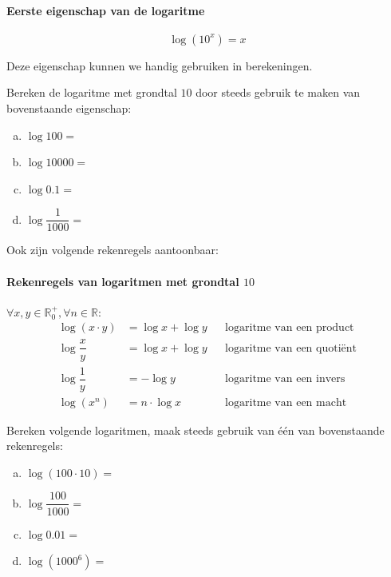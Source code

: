 \documentclass[12pt,twoside]{article}
\begin{document}
\paragraph*{Eerste eigenschap van de logaritme}
\begin{mdframed}
$$\log (10^x) = x$$
\end{mdframed}

Deze eigenschap kunnen we handig gebruiken in berekeningen.

\begin{oefening}
Bereken de logaritme met grondtal $10$ door steeds gebruik te maken van bovenstaande eigenschap:\\
\begin{enumerate}[(a)]
  \itemsep1em
  \item $\log 100 = $\arulefill
  \item $\log 10000 = $\arulefill
  \item $\log 0.1 = $\arulefill
  \item $\log \dfrac{1}{1000} = $\arulefill
\end{enumerate}
\end{oefening}

\pagebreak
Ook zijn volgende rekenregels aantoonbaar:

\paragraph*{Rekenregels van logaritmen met grondtal $10$}
\begin{mdframed}
$\forall x,y \in \mathbb{R}_0^+, \forall n\in \mathbb{R}:$
\begin{align*}
\log(x\cdot y) &= \log x + \log y && \mbox{logaritme van een product}\\
\log \dfrac{x}{y} &= \log x + \log y && \mbox{logaritme van een quotiënt}\\
\log \dfrac{1}{y} &= - \log y && \mbox{logaritme van een invers}\\
\log(x^n) &= n\cdot\log x && \mbox{logaritme van een macht}
\end{align*}
\end{mdframed}

\begin{oefening}
Bereken volgende logaritmen, maak steeds gebruik van één van bovenstaande rekenregels:\\
\begin{enumerate}[(a)]
  \itemsep1em
  \item $\log (100\cdot 10) = $\arulefill
  \item $\log \dfrac{100}{1000} = $\arulefill
  \item $\log 0.01 = $\arulefill
  \item $\log (1000^6) = $\arulefill
\end{enumerate}
\end{oefening}
\end{document}
